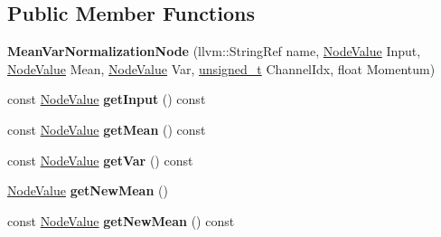 \subsection*{Public Member Functions}
\begin{DoxyCompactItemize}
\item 
\mbox{\label{classglow_1_1_mean_var_normalization_node_abc9ea5d794c3c15f7578877505dcaa7a}} 
{\bfseries Mean\+Var\+Normalization\+Node} (llvm\+::\+String\+Ref name, \hyperlink{structglow_1_1_node_value}{Node\+Value} Input, \hyperlink{structglow_1_1_node_value}{Node\+Value} Mean, \hyperlink{structglow_1_1_node_value}{Node\+Value} Var, \hyperlink{namespaceglow_a0ca574644e1e42ef193a9947fb4d8911}{unsigned\+\_\+t} Channel\+Idx, float Momentum)
\item 
\mbox{\label{classglow_1_1_mean_var_normalization_node_a19fda89bea81507c6277e9182d68d5f2}} 
const \hyperlink{structglow_1_1_node_value}{Node\+Value} {\bfseries get\+Input} () const
\item 
\mbox{\label{classglow_1_1_mean_var_normalization_node_a7787f48eeab86faf2874fc62538d29b7}} 
const \hyperlink{structglow_1_1_node_value}{Node\+Value} {\bfseries get\+Mean} () const
\item 
\mbox{\label{classglow_1_1_mean_var_normalization_node_aae92d741065a45a817ac4c2b03d47b4d}} 
const \hyperlink{structglow_1_1_node_value}{Node\+Value} {\bfseries get\+Var} () const
\item 
\mbox{\label{classglow_1_1_mean_var_normalization_node_ac68edbb90a3031c597feaa6a8bf11a59}} 
\hyperlink{structglow_1_1_node_value}{Node\+Value} {\bfseries get\+New\+Mean} ()
\item 
\mbox{\label{classglow_1_1_mean_var_normalization_node_a9c1a04c1ea59fbb9e8475b257be7c1a4}} 
const \hyperlink{structglow_1_1_node_value}{Node\+Value} {\bfseries get\+New\+Mean} () const
\item 
\mbox{\label{classglow_1_1_mean_var_normalization_node_a9771d6132faa1e919e27c8eaadfd2354}} 

\end{DoxyCompactItemize}

